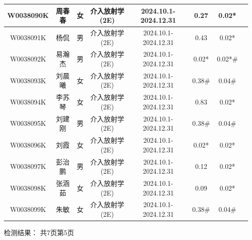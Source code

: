 \begin{table}[H]
\begin{tabular}{|c|c|c|c|c|c|c|c|}
\hline
W0038090K & 周春春 & 女 & 介入放射学(2E) & 2024.10.1-2024.12.31 & 0.27 & 0.02* &  \\
\hline
W0038091K & 杨侃 & 男 & 介入放射学(2E) & 2024.10.1-2024.12.31 & 0.43 & 0.02* &  \\
\hline
W0038092K & 易瀚杰 & 男 & 介入放射学(2E) & 2024.10.1-2024.12.31 & 0.02* & 0.02*\# &  \\
\hline
W0038093K & 刘晨曦 & 女 & 介入放射学(2E) & 2024.10.1-2024.12.31 & 0.38\# & 0.04\# &  \\
\hline
W0038094K & 李苏琴 & 女 & 介入放射学(2E) & 2024.10.1-2024.12.31 & 0.83 & 0.02* &  \\
\hline
W0038095K & 刘建刚 & 男 & 介入放射学(2E) & 2024.10.1-2024.12.31 & 0.38\# & 0.04\# &  \\
\hline
W0038096K & 刘霞 & 女 & 介入放射学(2E) & 2024.10.1-2024.12.31 & 0.02* & 0.02* &  \\
\hline
W0038097K & 彭治鹏 & 男 & 介入放射学(2E) & 2024.10.1-2024.12.31 & 0.12 & 0.02* &  \\
\hline
W0038098K & 张涵茹 & 女 & 介入放射学(2E) & 2024.10.1-2024.12.31 & 0.09 & 0.02* &  \\
\hline
W0038099K & 朱敏 & 女 & 介入放射学(2E) & 2024.10.1-2024.12.31 & 0.38\# & 0.04\# &  \\
\hline
\end{tabular}
\end{table}


检测结果：
共7页第5页

